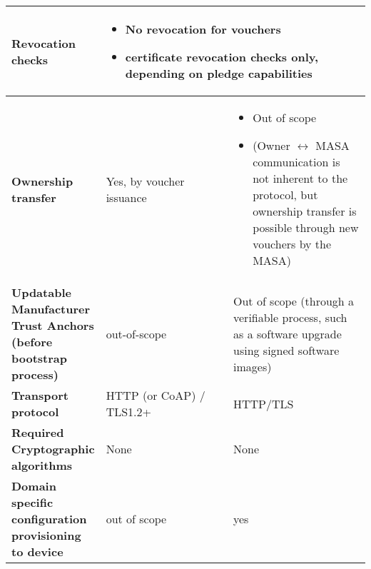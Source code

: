 \begin{longtable}{|p{0.23\linewidth}|p{0.372\linewidth}|p{0.393\linewidth}|}
		\hline
		\cellcolor[rgb]{ .745,  .804,  .843} \textbf{Revocation checks} & \multicolumn{2}{p{36.67em}|}{ 
		\begin{itemize}[leftmargin=*, topsep=0pt, noitemsep]
		\item
			No revocation for vouchers
		\item
			certificate revocation checks only, depending on pledge capabilities
		\end{itemize}
		 } \\

		\hline
		\cellcolor[rgb]{ .745,  .804,  .843} \textbf{Ownership transfer} &  Yes, by voucher issuance &
		\begin{itemize}[leftmargin=*, topsep=0pt, noitemsep]
		\item Out of scope
		\item (Owner $ \leftrightarrow $ MASA communication is not inherent to the protocol, but ownership transfer is possible through new vouchers by the MASA)
		\end{itemize}
		 \\

		\hline
		\cellcolor[rgb]{ .745,  .804,  .843} \textbf{Updatable Manufacturer Trust Anchors (before bootstrap process)} &  out-of-scope &  Out of scope (through a verifiable process, such as a software upgrade using signed software images) \\

		\hline
		\cellcolor[rgb]{ .745,  .804,  .843} \textbf{Transport protocol} &  HTTP (or CoAP) / TLS1.2+ &  HTTP/TLS \\

		\hline
		\cellcolor[rgb]{ .745,  .804,  .843} \textbf{Required Cryptographic algorithms } &  None &  None \\

		\hline
		\cellcolor[rgb]{ .745,  .804,  .843} \textbf{Domain specific configuration provisioning to device} &  out of scope &  yes \\
		\hline

\end{longtable}
%
%
